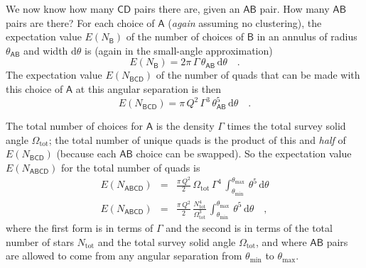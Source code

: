 \documentclass[letterpaper]{article}
\newcommand{\starlabel}[1]{\mathsf{#1}}
\newcommand{\AAA}{\starlabel{A}}
\newcommand{\BBB}{\starlabel{B}}
\newcommand{\CCC}{\starlabel{C}}
\newcommand{\DDD}{\starlabel{D}}
\newcommand{\thetaAB}{\theta_{\AAA\BBB}}
\newcommand{\dtheta}{\mathrm{d}\theta}
\newcommand{\ENB}{E(N_{\BBB})}
\newcommand{\ENBCD}{E(N_{\BBB\CCC\DDD})}
\newcommand{\ENABCD}{E(N_{\AAA\BBB\CCC\DDD})}
\newcommand{\Ntotal}{N_\mathrm{tot}}
\newcommand{\Omegatotal}{\Omega_\mathrm{tot}}
\newcommand{\thetamin}{\theta_\mathrm{min}}
\newcommand{\thetamax}{\theta_\mathrm{max}}
\begin{document}
We now know how many $\CCC\DDD$ pairs there are, given an $\AAA\BBB$
pair.  How many $\AAA\BBB$ pairs are there?  For each choice of $\AAA$
(\emph{again} assuming no clustering), the expectation value $\ENB$ of
the number of choices of $\BBB$ in an annulus of radius $\thetaAB$ and
width $\dtheta$ is (again in the small-angle approximation)
\begin{equation}
\ENB = 2\pi\,\Gamma\,\thetaAB\,\dtheta \quad .
\end{equation}
The expectation value $\ENBCD$ of the number of quads that can be made
with this choice of $\AAA$ at this angular separation is then
\begin{equation}
\ENBCD = \pi\,Q^2\,\Gamma^3\,\thetaAB^5\,\dtheta \quad .
\end{equation}

The total number of choices for $\AAA$ is the density $\Gamma$ times
the total survey solid angle $\Omegatotal$; the total number of unique
quads is the product of this and \emph{half} of $\ENBCD$ (because each
$\AAA\BBB$ choice can be swapped).  So the expectation value $\ENABCD$
for the total number of quads is
\begin{eqnarray}\displaystyle
\ENABCD & = & \frac{\pi\,Q^2}{2}\,\Omegatotal\,\Gamma^4\,
                \int_{\thetamin}^{\thetamax}\,\theta^5\,\dtheta \\
\ENABCD & = & \frac{\pi\,Q^2}{2}\,\frac{\Ntotal^4}{\Omegatotal^3}\,
                \int_{\thetamin}^{\thetamax}\,\theta^5\,\dtheta \quad ,
\end{eqnarray}
where the first form is in terms of $\Gamma$ and the second is in
terms of the total number of stars $\Ntotal$ and the total survey
solid angle $\Omegatotal$, and where $\AAA\BBB$ pairs are allowed to
come from any angular separation from $\thetamin$ to $\thetamax$.
\end{document}
